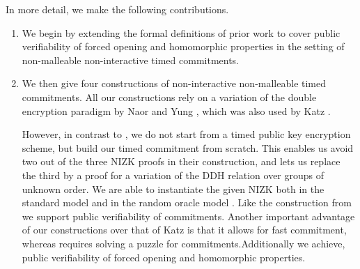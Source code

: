 In more detail, we make the following contributions.
\begin{enumerate}
\item We begin by extending the formal definitions of prior work to cover public verifiability of forced opening and homomorphic properties in the setting of non-malleable non-interactive timed commitments. 
\item We then give four constructions of non-interactive non-malleable timed commitments. All our constructions rely on a variation of the double encryption paradigm by Naor and Yung \cite{STOC:NaoYun90}, which was also used by Katz \etal \cite{TCC:KatLosXu20}. 

However, in contrast to \cite{TCC:KatLosXu20}, we do not start from a timed public key encryption scheme, but build our timed commitment from scratch. This enables us avoid two out of the three NIZK proofs in their construction, and lets us replace the third by a proof for a variation of the DDH relation over groups of unknown order. We are able to instantiate the given NIZK both in the standard model and in the random oracle model \cite{CCS:BelRog93}. Like the construction from \cite{TCC:KatLosXu20} we support public verifiability of commitments. Another important advantage of our constructions over that of Katz \etal \cite{TCC:KatLosXu20} is that it allows for fast commitment, whereas \cite{TCC:KatLosXu20} requires solving a puzzle for commitments.Additionally we achieve, public verifiability of forced opening and homomorphic properties. 
\end{enumerate}

